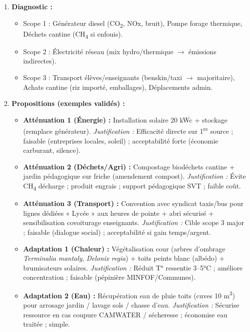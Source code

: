 \documentclass[11pt]{article}
\begin{document}
\begin{corrige}
\begin{enumerate}
    \item \textbf{Diagnostic :}
        \begin{itemize}
            \item Scope 1 : Générateur diesel (CO\textsubscript{2}, NOx, bruit), Pompe forage thermique, Déchets cantine (CH\textsubscript{4} si enfouis).
            \item Scope 2 : Électricité réseau (mix hydro/thermique $\rightarrow$ émissions indirectes).
            \item Scope 3 : Transport élèves/enseignants (benskin/taxi $\rightarrow$ majoritaire), Achats cantine (riz importé, emballages), Déplacements admin.
        \end{itemize}
    \item \textbf{Propositions (exemples validés) :}
        \begin{itemize}
            \item \textbf{Atténuation 1 (Énergie) :} Installation solaire 20 kWc + stockage (remplace générateur). \textit{Justification :} Efficacité directe sur 1\textsuperscript{re} source ; faisable (entreprises locales, soleil) ; acceptabilité forte (économie carburant, silence).
            \item \textbf{Atténuation 2 (Déchets/Agri) :} Compostage biodéchets cantine + jardin pédagogique sur friche (amendement compost). \textit{Justification :} Évite CH\textsubscript{4} décharge ; produit engrais ; support pédagogique SVT ; faible coût.
            \item \textbf{Atténuation 3 (Transport) :} Convention avec syndicat taxis/bus pour lignes dédiées « Lycée » aux heures de pointe + abri sécurisé + sensibilisation covoiturage enseignants. \textit{Justification :} Cible scope 3 major ; faisable (dialogue social) ; acceptabilité si gain temps/argent.
            \item \textbf{Adaptation 1 (Chaleur) :} Végétalisation cour (arbres d'ombrage \emph{Terminalia mantaly}, \emph{Delonix regia}) + toits peints blanc (albédo) + brumisateurs solaires. \textit{Justification :} Réduit T° ressentie 3--5°C ; améliore concentration ; faisable (pépinière MINFOF/Communes).
            \item \textbf{Adaptation 2 (Eau) :} Récupération eau de pluie toits (cuves 10 m\textsuperscript{3}) pour arrosage jardin / lavage sols / chasse d'eau. \textit{Justification :} Sécurise ressource en cas coupure CAMWATER / sécheresse ; économise eau traitée ; simple.

\end{itemize}
\end{enumerate}
\end{corrige}
\end{document}
